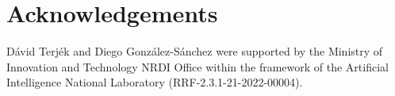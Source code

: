 \documentclass[twoside,11pt]{article}
\begin{document}
\section*{Acknowledgements}
D\'avid Terj\'ek and Diego Gonz\'alez-S\'anchez were supported by the Ministry of Innovation and Technology NRDI Office within the framework of the Artificial Intelligence National Laboratory (RRF-2.3.1-21-2022-00004).

\newpage





\end{document}
